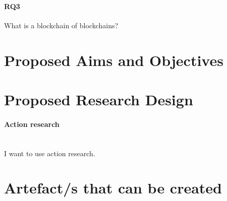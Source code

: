 \documentclass[12pt]{article}
\begin{document}
\paragraph{RQ3} What is a blockchain of blockchains?

\section{Proposed Aims and Objectives}

\section{Proposed Research Design}
\paragraph{Action research}\mbox{} \\
I want to use action research.
\section{Artefact/s that can be created}

\printbibliography
\end{document}
